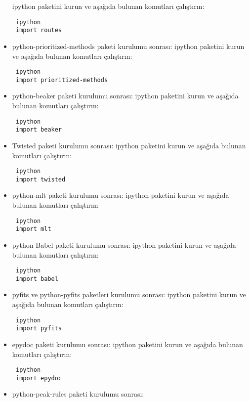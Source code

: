 \documentclass[a4paper,10pt]{article}
\begin{document}
\begin{itemize}
ipython paketini kurun ve aşağıda bulunan komutları çalıştırın:
\begin{verbatim}
 ipython
 import routes
\end{verbatim}


\item python-prioritized-methods paketi kurulumu sonrası:
ipython paketini kurun ve aşağıda bulunan komutları çalıştırın:
\begin{verbatim}
 ipython
 import prioritized-methods
\end{verbatim}


\item python-beaker paketi kurulumu sonrası:
ipython paketini kurun ve aşağıda bulunan komutları çalıştırın:
\begin{verbatim}
 ipython
 import beaker
\end{verbatim}

\item Twisted paketi kurulumu sonrası:
ipython paketini kurun ve aşağıda bulunan komutları çalıştırın:
\begin{verbatim}
 ipython
 import twisted
\end{verbatim}

\item python-mlt paketi kurulumu sonrası:
ipython paketini kurun ve aşağıda bulunan komutları çalıştırın:
\begin{verbatim}
 ipython
 import mlt
\end{verbatim}


\item python-Babel paketi kurulumu sonrası:
ipython paketini kurun ve aşağıda bulunan komutları çalıştırın:
\begin{verbatim}
 ipython
 import babel
\end{verbatim}

\item pyfits ve python-pyfits  paketleri kurulumu sonrası:
ipython paketini kurun ve aşağıda bulunan komutları çalıştırın:
\begin{verbatim}
 ipython
 import pyfits
\end{verbatim}


\item epydoc paketi kurulumu sonrası:
ipython paketini kurun ve aşağıda bulunan komutları çalıştırın:
\begin{verbatim}
 ipython
 import epydoc
\end{verbatim}

\item python-peak-rules paketi kurulumu sonrası:


\end{itemize}
\end{document}

